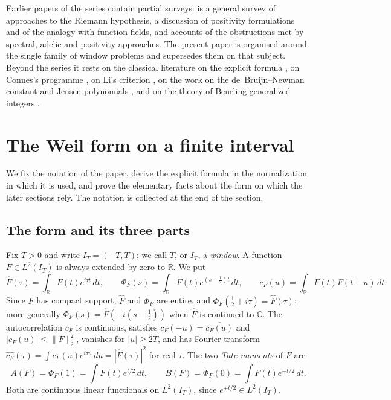 \documentclass[11pt]{amsart}
\theoremstyle{definition}
\theoremstyle{remark}
\numberwithin{equation}{section}
\newcommand{\C}{\mathbb{C}}
\newcommand{\R}{\mathbb{R}}
\newcommand{\IT}{I_T}                                  %
\newcommand{\Fh}{\widehat F}                           %
\newcommand{\cF}{c_F}                                  %
\newcommand{\PhiF}{\Phi_F}                             %
\begin{document}
Earlier papers of the series contain partial surveys: \cite{P01} is a general survey of approaches to the
Riemann hypothesis, \cite{P06} a discussion of positivity formulations and of the analogy with function fields,
and \cite{P34,P36} accounts of the obstructions met by spectral, adelic and positivity approaches. The present
paper is organised around the single family of window problems and supersedes them on that subject. Beyond the
series it rests on the classical literature on the explicit formula \cite{Weil52,Bombieri2000,Yoshida1992}, on
Connes's programme \cite{Connes1999,ConnesConsani2021}, on Li's criterion \cite{Li1997,BombieriLagarias1999},
on the work on the de~Bruijn--Newman constant and Jensen polynomials
\cite{deBruijn1950,Newman1976,RodgersTao2020,GORZ2019}, and on the theory of Beurling generalized integers \cite{DiamondZhang2016,DMV2006,Zhang2007}.

\section{The Weil form on a finite interval}\label{w1:sec:setting}

We fix the notation of the paper, derive the explicit formula in the
normalization in which it is used, and prove the elementary facts about the
form on which the later sections rely. The notation is collected at the end of
the section.

\subsection{The form and its three parts}
Fix $T>0$ and write $\IT=(-T,T)$; we call $T$, or $\IT$, a \emph{window}.
A function $F\in L^2(\IT)$ is always extended by zero to $\R$. We put
\begin{equation}\label{w1:eq:transforms}
  \Fh(\tau)=\int_\R F(t)e^{i\tau t}\,dt,\qquad
  \PhiF(s)=\int_\R F(t)e^{(s-\frac12)t}\,dt,\qquad
  \cF(u)=\int_\R F(t)\overline{F(t-u)}\,dt .
\end{equation}
Since $F$ has compact support, $\Fh$ and $\PhiF$ are entire, and
$\PhiF(\tfrac12+i\tau)=\Fh(\tau)$; more generally $\PhiF(s)=\Fh(-i(s-\frac12))$
when $\Fh$ is continued to $\C$. The autocorrelation $\cF$ is continuous,
satisfies $\cF(-u)=\overline{\cF(u)}$ and $|\cF(u)|\le\|F\|_2^2$, vanishes for
$|u|\ge2T$, and has Fourier transform
$\widehat{\cF}(\tau)=\int\cF(u)e^{i\tau u}\,du=|\Fh(\tau)|^2$ for real $\tau$.
The two \emph{Tate moments} of $F$ are
\begin{equation}\label{w1:eq:tate}
  A(F)=\PhiF(1)=\int F(t)e^{t/2}\,dt,\qquad
  B(F)=\PhiF(0)=\int F(t)e^{-t/2}\,dt .
\end{equation}
Both are continuous linear functionals on $L^2(\IT)$, since
$e^{\pm t/2}\in L^2(\IT)$.
\end{document}
